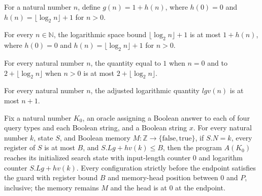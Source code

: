 \begin{definition}
\label{Complexity.LogProg.ExpBFS.lgv}
\leanok
{}
For a natural number $n$, define $g(n)=1+h(n)$, where $h(0)=0$ and $h(n)=\lfloor\log_2
n\rfloor+1$ for $n>0$.
\end{definition}

\begin{lemma}
\label{Complexity.LogProg.ExpBFS.logSpace_le_lgv}
\leanok
{}
For every $n\in\mathbb N$, the logarithmic space bound $\lfloor\log_2 n\rfloor+1$ is at
most $1+h(n)$, where $h(0)=0$ and $h(n)=\lfloor\log_2 n\rfloor+1$ for $n>0$.
\end{lemma}

\begin{lemma}
\label{Complexity.LogProg.ExpBFS.lgv_le}
\leanok
{}
For every natural number $n$, the quantity equal to $1$ when $n=0$ and to
$2+\lfloor\log_2 n\rfloor$ when $n>0$ is at most $2+\lfloor\log_2 n\rfloor$.
\end{lemma}

\begin{lemma}
\label{Complexity.LogProg.ExpBFS.lgv_le_succ}
\leanok
{}
For every natural number $n$, the adjusted logarithmic quantity $lgv(n)$ is at most
$n+1$.
\end{lemma}

\begin{theorem}
\label{Complexity.LogProg.ExpBFS.lg_run}
\leanok
{}
Fix a natural number $K_0$, an oracle assigning a Boolean answer to each of four query
types and each Boolean string, and a Boolean string $x$. For every natural number $k$,
state $S$, and Boolean memory $M:\mathbb{Z}\to\{\mathrm{false},\mathrm{true}\}$, if
$S.N=k$, every register of $S$ is at most $B$, and $S.Lg+hv(k)\le B$, then the program
$A(K_0)$ reaches its initialized search state with input-length counter $0$ and
logarithm counter $S.Lg+hv(k)$. Every configuration strictly before the endpoint
satisfies the guard with register bound $B$ and memory-head position between $0$ and
$P$, inclusive; the memory remains $M$ and the head is at $0$ at the endpoint.
\end{theorem}

